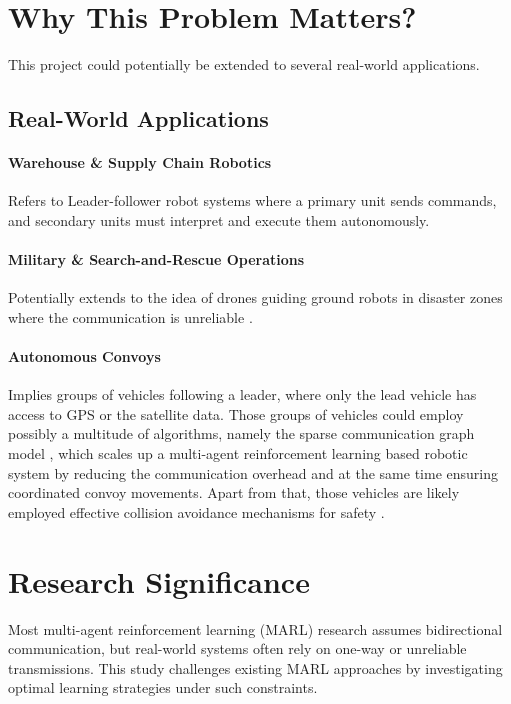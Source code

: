 \documentclass[a4paper,11pt]{article}
\begin{document}
\section{Why This Problem Matters?}

This project could potentially be extended to several real-world applications. 

\subsection{Real-World Applications}

\paragraph{Warehouse \& Supply Chain Robotics \cite{swarm-RL-overview}} Refers to Leader-follower robot systems where a primary unit sends commands, and secondary units must interpret and execute them autonomously.

\paragraph{Military \& Search-and-Rescue Operations} Potentially extends to the idea of drones guiding ground robots in disaster zones where the communication is unreliable \cite{D-MARL}.

\paragraph{Autonomous Convoys \cite{MARL-coord-commun-control}} Implies groups of vehicles following a leader, where only the lead vehicle has access to GPS or the satellite data. Those groups of vehicles could employ possibly a multitude of algorithms, namely the sparse communication graph model \cite{scaling-MARL-adaptive-sparese-commun-graph}, which scales up a multi-agent reinforcement learning based robotic system by reducing the communication overhead and at the same time ensuring coordinated convoy movements. Apart from that, those vehicles are likely employed effective collision avoidance mechanisms for safety \cite{bio-collision-avoidance-swarm-deepRL}.

\section{Research Significance} 

Most multi-agent reinforcement learning (MARL) research assumes bidirectional communication, but real-world systems often rely on one-way or unreliable transmissions. This study challenges existing MARL approaches by investigating optimal learning strategies under such constraints.
\end{document}
